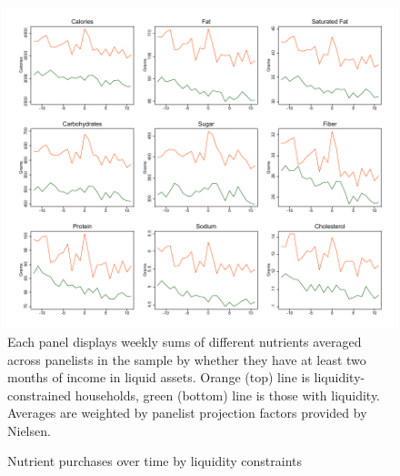 \documentclass[12pt]{article}
\begin{document}
\clearpage
\begin{figure}[t]
\begin{center}
\caption{Nutrient purchases over time by liquidity constraints}
\label{graph_raw_nutrients}
\includegraphics[width=1\textwidth, angle=0]{../figures/raw_nutrients_week.pdf}
\footnotesize Each panel displays weekly sums of different nutrients averaged across panelists in the sample by whether they have at least two months of income in liquid assets. Orange (top) line is liquidity-constrained households, green (bottom) line is those with liquidity. Averages are weighted by panelist projection factors provided by Nielsen.
\end{center}
\end{figure}
\end{document}
